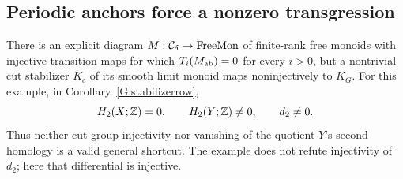 \subsection{Periodic anchors force a nonzero transgression}

\begin{example}
\label{G:periodicanchors}
There is an explicit diagram $M:\mathcal C_\delta\to\mathrm{FreeMon}$ of
finite-rank free monoids with injective transition maps for which
$T_i(M_{\mathrm{ab}})=0$ for every $i>0$, but a nontrivial cut stabilizer
$K_c$ of its smooth limit monoid maps noninjectively to $K_G$.
For this example, in Corollary~\ref{G:stabilizerrow},
\[
 H_2(X;\mathbb Z)=0,\qquad H_2(Y;\mathbb Z)\ne0,\qquad d_2\ne0.
\]
Thus neither cut-group injectivity nor vanishing of the quotient
$Y$'s second homology is a valid general shortcut. The example
does not refute injectivity of $d_2$; here that differential is
injective.
\end{example}
